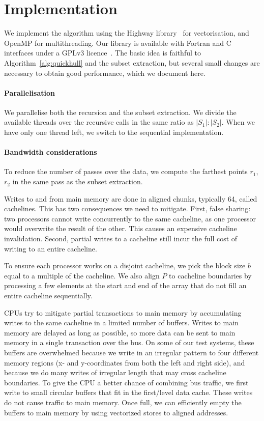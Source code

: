 \documentclass[11pt,a4paper]{article}
\begin{document}
\section{Implementation}\label{sec:impl}
We implement the algorithm using the Highway library~\cite{wassenberg2022vectorized} for vectorisation, and OpenMP for multithreading.
Our library is available with Fortran and C interfaces under a GPLv3 licence~\cite{vqhull2025repository}.
The basic idea is faithful to Algorithm~\ref{alg:quickhull} and the subset extraction, but several small changes are necessary to obtain good performance, which we document here.

\paragraph{Parallelisation}
We parallelise both the recursion and the subset extraction.
We divide the available threads over the recursive calls in the same ratio as $|S_1| : |S_2|$.
When we have only one thread left, we switch to the sequential implementation.

\paragraph{Bandwidth considerations}
To reduce the number of passes over the data, we compute the farthest points $r_1$, $r_2$ in the same pass as the subset extraction.

Writes to and from main memory are done in aligned chunks, typically \qty{64}{\byte}, called cachelines.
This has two consequences we need to mitigate.
First, false sharing: two processors cannot write concurrently to the same cacheline, as one processor would overwrite the result of the other.
This causes an expensive cacheline invalidation.
Second, partial writes to a cacheline still incur the full cost of writing to an entire cacheline.

To ensure each processor works on a disjoint cacheline, we pick the block size $b$ equal to a multiple of the cacheline.
We also align $P$ to cacheline boundaries by processing a few elements at the start and end of the array that do not fill an entire cacheline sequentially.

CPUs try to mitigate partial transactions to main memory by accumulating writes to the same cacheline in a limited number of buffers.
Writes to main memory are delayed as long as possible, so more data can be sent to main memory in a single transaction over the bus.
On some of our test systems, these buffers are overwhelmed because we write in an irregular pattern to four different memory regions (x- and y-coordinates from both the left and right side), and because we do many writes of irregular length that may cross cacheline boundaries.
To give the CPU a better chance of combining bus traffic, we first write to small circular buffers that fit in the first\-/level data cache.
These writes do not cause traffic to main memory.
Once full, we can efficiently empty the buffers to main memory by using vectorized stores to aligned addresses.
\end{document}

